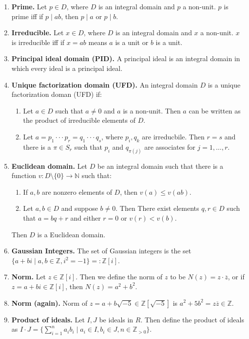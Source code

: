 \begin{enumerate}
	\item \textbf{Prime. } Let $p \in D$, where $D$ is an integral domain and $p$ a non-unit. $p$ is prime iff if $p \mid ab$, then $p \mid a$ or $p \mid b$. 
	\item \textbf{Irreducible. } Let $x \in D$, where $D$ is an integral domain and $x$ a non-unit. $x$ is irreducible iff if $x =ab$ means $a$ is a unit or $b$ is a unit. 
	\item \textbf{Principal ideal domain (PID). } A principal ideal is an integral domain in which every ideal is a principal ideal. 
	\item \textbf{Unique factorization domain (UFD). } An integral domain $D$ is a unique factorization doman (UFD) if: 
	\begin{enumerate}
		\item Let $a \in D$ such that $a \neq 0$ and $a$ is a non-unit. Then $a$ can be written as the product of irreducible elements of $D$. 
		\item Let $a = p_1 \cdot \cdot \cdot p_r = q_1 \cdot \cdot \cdot q_s$, where $p_i,q_k$ are irreducbile. Then $r=s$ and there is a $\pi \in S_r$ such that $p_i$ and $q_{\pi(j)}$ are associates for $j=1,\dots,r$. 
	\end{enumerate}
	\item \textbf{Euclidean domain. } Let $D$ be an integral domain such that there is a function $v: D \setminus \{0\} \to \mathbb{N}$ such that: 
	\begin{enumerate}
		\item If $a,b$ are nonzero elements of $D$, then $v(a) \leq v(ab)$. 
		\item Let $a,b \in D$ and suppose $b \neq 0$. Then There exist elements $q,r \in D$ such that $a=bq+r$ and either $r=0$ or $v(r) < v(b)$. 
	\end{enumerate}
	Then $D$ is a Euclidean domain. 
	\item \textbf{Gaussian Integers. } The set of Gaussian integers is the set $\{a + bi \mid a,b \in \mathbb{Z}, i^2 = -1\} =: \mathbb{Z}[i]$. 
	\item \textbf{Norm. } Let $z \in \mathbb{Z}[i]$. Then we define the norm of $z$ to be $N(z)=z \cdot \overline{z}$, or if $z=a+bi \in \mathbb{Z}[i]$, then $N(z) = a^2 + b^2$. 
	\item \textbf{Norm (again). } Norm of $z = a+b\sqrt{-5} \in \mathbb{Z}[\sqrt{-5}]$ is $a^2 + 5b^2 = z\overline{z} \in \mathbb{Z}$. 
	\item \textbf{Product of ideals. } Let $I,J$ be ideals in $R$. Then define the product of ideals as $I \cdot J = \{\sum_{i=1}^{n} a_ib_i \mid a_i \in I, b_i \in J, n \in \mathbb{Z}_{>0}\}$. 

\end{enumerate}
